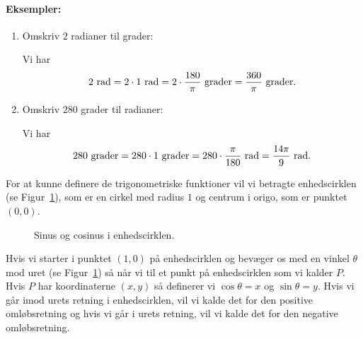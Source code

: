 \paragraph*{Eksempler:}
\begin{enumerate}
\item Omskriv $2$ radianer til grader:

Vi har 
\begin{align*}
2 \textup{ rad} = 2 \cdot 1 \textup{ rad} = 2 \cdot \frac{180}{\pi} \textup{ grader} = \frac{360}{\pi} \textup{ grader}.
\end{align*}
\item Omskriv $280$ grader til radianer:

Vi har
\begin{align*}
280 \textup{ grader} = 280 \cdot 1 \textup{ grader} = 280 \cdot \frac{\pi}{180} \textup{ rad} = \frac{14\pi}{9} \textup{ rad}.
\end{align*}
\end{enumerate}
For at kunne definere de trigonometriske funktioner vil vi betragte enhedscirklen (se Figur~\ref{fig:funktioner5et}), som er en cirkel med radius $1$ og centrum i origo, som er punktet $(0,0)$.
\begin{figure}
\centering
{}
\caption{Sinus og cosinus i enhedscirklen.}
\label{fig:funktioner5et}
\end{figure}
Hvis vi starter i punktet $(1,0)$ på enhedscirklen og bevæger os med en vinkel $\theta$ mod uret (se Figur~\ref{fig:funktioner5et}) så når vi til et punkt på enhedscirklen som vi kalder $P$. Hvis $P$ har koordinaterne $(x,y)$ så definerer vi $\cos\theta=x$ og $\sin\theta=y$. Hvis vi går imod urets retning i enhedscirklen, vil vi kalde det for den positive omløbsretning og hvis vi går i urets retning, vil vi kalde det for den negative omløbsretning.

